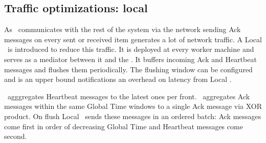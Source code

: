 



\subsection{Traffic optimizations: local \tracker\ }

As \tracker\ communicates with the rest of the system via the network sending Ack messages on every sent or received item generates a lot of network traffic. A Local \tracker\ is introduced to reduce this traffic. It is deployed at every worker machine and serves as a mediator between it and the \tracker. It buffers incoming Ack and Heartbeat messages and flushes them periodically. The flushing window can be configured and  is an upper bound notifications an overhead on latency from Local \tracker.

\tracker\ agggregates Heartbeat messages to the latest ones per front. \tracker\ aggregates Ack messages within the same Global Time windows to a single Ack message via XOR product. On flush Local \tracker\ sends these messages in an ordered batch: Ack messages come first in order of decreasing Global Time and Heartbeat messages come second.

